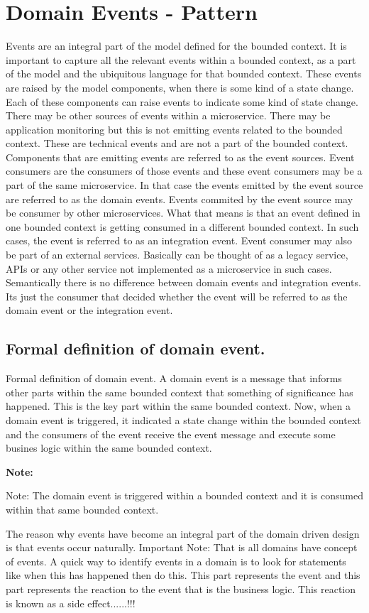 \documentclass[a4paper, 11pt]{book}
\newenvironment{note}{
    \begin{siderule}
        \textbf{Note: }
        }{
    \end{siderule}
}
\begin{document}
    \section{Domain Events - Pattern}
    Events are an integral part of the model defined for the bounded context.
    It is important to capture all the relevant events within a bounded context, as a part of the model and the ubiquitous language for that bounded context.
    These events are raised by the model components, when there is some kind of a state change.
    Each of these components can raise events to indicate some kind of state change.
    There may be other sources of events within a microservice.
    There may be application monitoring but this is not emitting events related to the bounded context.
    These are technical events and are not a part of the bounded context.
    Components that are emitting events are referred to as the event sources.
    Event consumers are the consumers of those events and these event consumers may be a part of the same microservice.
    In that case the events emitted by the event source are referred to as the domain events.
    Events commited by the event source may be consumer by other microservices.
    What that means is that an event defined in one bounded context is getting consumed in a different bounded context.
    In such cases, the event is referred to as an integration event.
    Event consumer may also be part of an external services. Basically can be thought of as a legacy service, APIs or any other service not implemented as a microservice in such cases.
    Semantically there is no difference between domain events and integration events.
    Its just the consumer that decided whether the event will be referred to as the domain event or the integration event.

    \subsection{Formal definition of domain event.}
    Formal definition of domain event.
    A domain event is a message that informs other parts within the same bounded context that something of significance has happened.
    This is the key part within the same bounded context.
    Now, when a domain event is triggered, it indicated a state change within the bounded context and the consumers of the event receive the event message and execute some busines logic within the same bounded context.
    \begin{note}
        Note: The domain event is triggered within a bounded context and it is consumed within that same bounded context.
    \end{note}
    The reason why events have become an integral part of the domain driven design is that events occur naturally.
    Important Note: That is all domains have concept of events.
    A quick way to identify events in a domain is to look for statements like when this has happened then do this.
    This part represents the event and this part represents the reaction to the event that is the business logic.
    This reaction is known as a side effect......!!!
\end{document}
